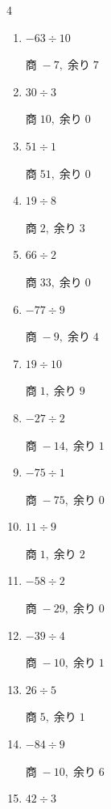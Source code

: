 \begin{multicols}{4}
\begin{enumerate}
        $商\; 0,\; 余り\; 6$

  \item $-63 \div 10$

        $商\; -7,\; 余り\; 7$

  \item $30 \div 3$

        $商\; 10,\; 余り\; 0$

  \item $51 \div 1$

        $商\; 51,\; 余り\; 0$

  \item $19 \div 8$

        $商\; 2,\; 余り\; 3$

  \item $66 \div 2$

        $商\; 33,\; 余り\; 0$

  \item $-77 \div 9$

        $商\; -9,\; 余り\; 4$

  \item $19 \div 10$

        $商\; 1,\; 余り\; 9$

  \item $-27 \div 2$

        $商\; -14,\; 余り\; 1$

  \item $-75 \div 1$

        $商\; -75,\; 余り\; 0$

  \item $11 \div 9$

        $商\; 1,\; 余り\; 2$

\columnbreak %

  \item $-58 \div 2$

        $商\; -29,\; 余り\; 0$

  \item $-39 \div 4$

        $商\; -10,\; 余り\; 1$

  \item $26 \div 5$

        $商\; 5,\; 余り\; 1$

  \item $-84 \div 9$

        $商\; -10,\; 余り\; 6$

  \item $42 \div 3$


\end{enumerate}
\end{multicols}

